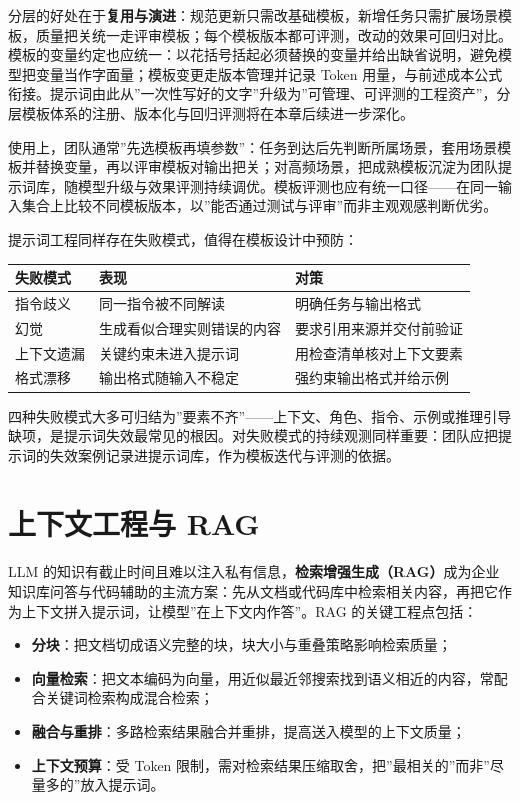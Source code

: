 \documentclass[12pt,a4paper,twoside,openany]{ctexbook}
\numberwithin{figure}{chapter}
\numberwithin{table}{chapter}
\providecommand{\tightlist}{\setlength{\itemsep}{0pt}\setlength{\parskip}{0pt}}
\newcounter{none}
\begin{document}
分层的好处在于\textbf{复用与演进}：规范更新只需改基础模板，新增任务只需扩展场景模板，质量把关统一走评审模板；每个模板版本都可评测，改动的效果可回归对比。模板的变量约定也应统一：以花括号括起必须替换的变量并给出缺省说明，避免模型把变量当作字面量；模板变更走版本管理并记录
Token
用量，与前述成本公式衔接。提示词由此从''一次性写好的文字''升级为''可管理、可评测的工程资产''，分层模板体系的注册、版本化与回归评测将在本章后续进一步深化。

使用上，团队通常''先选模板再填参数''：任务到达后先判断所属场景，套用场景模板并替换变量，再以评审模板对输出把关；对高频场景，把成熟模板沉淀为团队提示词库，随模型升级与效果评测持续调优。模板评测也应有统一口径------在同一输入集合上比较不同模板版本，以''能否通过测试与评审''而非主观观感判断优劣。

提示词工程同样存在失败模式，值得在模板设计中预防：

{\def\LTcaptype{none} %
\begin{longtable}[]{@{}lll@{}}
\toprule\noalign{}
失败模式 & 表现 & 对策 \\
\midrule\noalign{}
\endhead
\bottomrule\noalign{}
\endlastfoot
指令歧义 & 同一指令被不同解读 & 明确任务与输出格式 \\
幻觉 & 生成看似合理实则错误的内容 & 要求引用来源并交付前验证 \\
上下文遗漏 & 关键约束未进入提示词 & 用检查清单核对上下文要素 \\
格式漂移 & 输出格式随输入不稳定 & 强约束输出格式并给示例 \\
\end{longtable}
}

四种失败模式大多可归结为''要素不齐''------上下文、角色、指令、示例或推理引导缺项，是提示词失效最常见的根因。对失败模式的持续观测同样重要：团队应把提示词的失效案例记录进提示词库，作为模板迭代与评测的依据。

\section{上下文工程与
RAG}\label{ux4e0aux4e0bux6587ux5de5ux7a0bux4e0e-rag}

LLM
的知识有截止时间且难以注入私有信息，\textbf{检索增强生成（RAG）}成为企业知识库问答与代码辅助的主流方案：先从文档或代码库中检索相关内容，再把它作为上下文拼入提示词，让模型''在上下文内作答''。RAG
的关键工程点包括：

\begin{itemize}
\tightlist
\item
  \textbf{分块}：把文档切成语义完整的块，块大小与重叠策略影响检索质量；
\item
  \textbf{向量检索}：把文本编码为向量，用近似最近邻搜索找到语义相近的内容，常配合关键词检索构成混合检索；
\item
  \textbf{融合与重排}：多路检索结果融合并重排，提高送入模型的上下文质量；
\item
  \textbf{上下文预算}：受 Token
  限制，需对检索结果压缩取舍，把''最相关的''而非''尽量多的''放入提示词。
\end{itemize}
\end{document}
